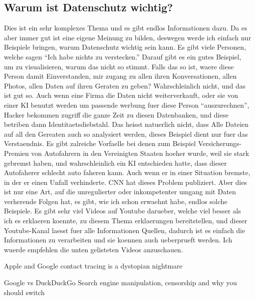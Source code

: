 \documentclass{report}
\begin{document}
\subsection{Warum ist Datenschutz wichtig?}
Dies ist ein sehr komplexes Thema und es gibt endlos Informationen dazu. Da es aber immer gut ist eine eigene Meinung zu bilden, deswegen werde ich einfach nur Beispiele bringen, warum Datenschutz wichtig sein kann. Es gibt viele Personen, welche sagen \enquote{Ich habe nichts zu verstecken.} Darauf gibt es ein gutes Beispiel, um zu visualisieren, warum das nicht so stimmt. Falls das so ist, waere diese Person damit Einverstanden, mir zugang zu allen ihren Konversationen, allen Photos, allen Daten auf ihren Geraten zu geben? Wahrschleinlich nicht, und das ist gut so. Auch wenn eine Firma die Daten nicht weiterverkauft, oder sie von einer KI benutzt werden um passende werbung fuer diese Person \enquote{auszurechnen}, Hacker bekommen zugriff die ganze Zeit zu diesen Datenbanken, und diese betriben dann Identitaetsdiebstahl. Das heisst natuerlich nicht, dass Alle Dateien auf all den Gereaten auch so analysiert werden, dieses Beispiel dient nur fuer das Verstaendnis.
\newline
Es gibt zalreiche Vorfaelle bei denen zum Beispiel Versicherungs-Premien von Autofahrern in den Vereinigten Staaten hoeher wurde, weil sie stark gebremst haben, und wahrschleinlich ein KI entschieden hatte, dass dieser Autofaherer schlecht auto faheren kann. Auch wenn er in einer Situation bremste, in der er einen Unfall verhinderte. CNN hat dieses Problem publiziert. \citep{car-syping-cnn}
\newline
Aber dies ist nur eine Art, auf die unregulierter oder inkompetenter umgang mit Daten verherende Folgen hat, es gibt, wie ich schon erwaehnt habe, endlos solche Beispiele.
\newline
Es gibt sehr viel Videos auf Youtube darueber, welche viel besser als ich es erklaeren koennte, zu diesem Thema erklaerungen bereitstellen, und dieser Youtube-Kanal \citep{tha-hated-one-yt-channel} laesst fuer alle Informationen Quellen, dadurch ist es einfach die Informationen zu verarbeiten und sie koennen auch ueberprueft werden.
Ich wuerde empfehlen die unten gelisteten Videos anzuschauen.

Apple and Google contact tracing is a dystopian nightmare \citep{contact-tracing}

Google vs DuckDuckGo Search engine manipulation, censorship and why you should switch \citep{google-DuckDuckGo}
\end{document}
